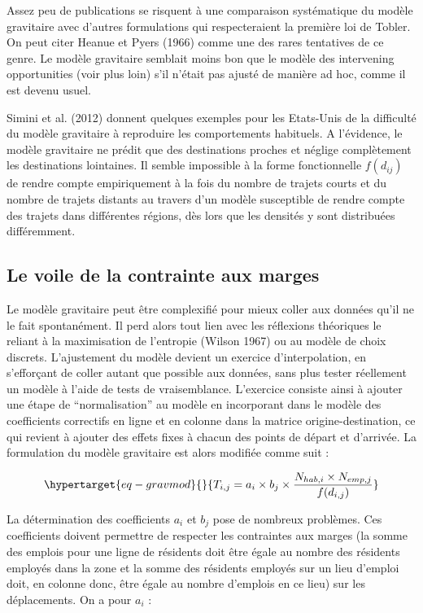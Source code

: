 \documentclass[
  10pt,
  a4paper,
  numbers=noendperiod,
  DIV=12]{scrartcl}
\begin{document}
Assez peu de publications se risquent à une comparaison systématique du
modèle gravitaire avec d'autres formulations qui respecteraient la
première loi de Tobler. On peut citer Heanue et Pyers (1966) comme une
des rares tentatives de ce genre. Le modèle gravitaire semblait moins
bon que le modèle des intervening opportunities (voir plus loin) s'il
n'était pas ajusté de manière ad hoc, comme il est devenu usuel.

Simini et al. (2012) donnent quelques exemples pour les Etats-Unis de la
difficulté du modèle gravitaire à reproduire les comportements
habituels. A l'évidence, le modèle gravitaire ne prédit que des
destinations proches et néglige complètement les destinations
lointaines. Il semble impossible à la forme fonctionnelle \(f(d_{ij})\)
de rendre compte empiriquement à la fois du nombre de trajets courts et
du nombre de trajets distants au travers d'un modèle susceptible de
rendre compte des trajets dans différentes régions, dès lors que les
densités y sont distribuées différemment.

\hypertarget{le-voile-de-la-contrainte-aux-marges}{%
\subsection{Le voile de la contrainte aux
marges}\label{le-voile-de-la-contrainte-aux-marges}}

Le modèle gravitaire peut être complexifié pour mieux coller aux données
qu'il ne le fait spontanément. Il perd alors tout lien avec les
réflexions théoriques le reliant à la maximisation de l'entropie (Wilson
1967) ou au modèle de choix discrets. L'ajustement du modèle devient un
exercice d'interpolation, en s'efforçant de coller autant que possible
aux données, sans plus tester réellement un modèle à l'aide de tests de
vraisemblance. L'exercice consiste ainsi à ajouter une étape de
``normalisation'' au modèle en incorporant dans le modèle des
coefficients correctifs en ligne et en colonne dans la matrice
origine-destination, ce qui revient à ajouter des effets fixes à chacun
des points de départ et d'arrivée. La formulation du modèle gravitaire
est alors modifiée comme suit :

\begin{equation}\protect\hypertarget{eq-gravmod}{}{
T_{i,j} = a_i \times b_j \times \frac {N_{hab, i}\times N_{emp, j}} {f(d_{i,j})}
}\label{eq-gravmod}\end{equation}

La détermination des coefficients \(a_i\) et \(b_j\) pose de nombreux
problèmes. Ces coefficients doivent permettre de respecter les
contraintes aux marges (la somme des emplois pour une ligne de résidents
doit être égale au nombre des résidents employés dans la zone et la
somme des résidents employés sur un lieu d'emploi doit, en colonne donc,
être égale au nombre d'emplois en ce lieu) sur les déplacements. On a
pour \(a_i\) :
\end{document}
